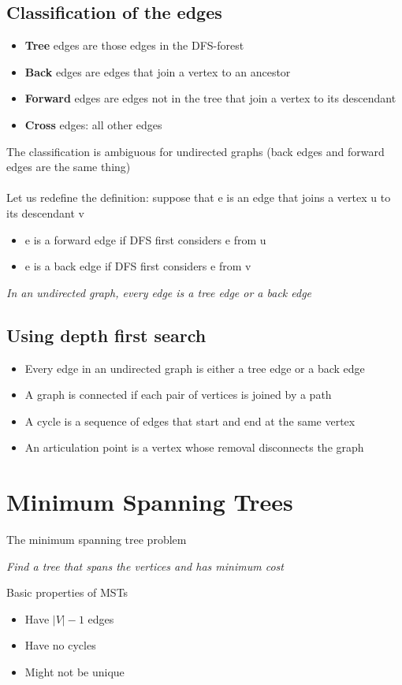 \documentclass{article}[18pt]
\begin{document}
\subsection{Classification of the edges}
\begin{itemize}
	\item \textbf{Tree} edges are those edges in the DFS-forest
	\item \textbf{Back} edges are edges that join a vertex to an ancestor
	\item \textbf{Forward} edges are edges not in the tree that join a vertex to its descendant
	\item \textbf{Cross} edges: all other edges
\end{itemize}
The classification is ambiguous for undirected graphs (back edges and forward edges are the same thing)\\
\\
Let us redefine the definition: suppose that e is an edge that joins a vertex u to its descendant v
\begin{itemize}
	\item e is a forward edge if DFS first considers e from u
	\item e is a back edge if DFS first considers e from v
\end{itemize}
\begin{center}
	\textit{In an undirected graph, every edge is a tree edge or a back edge}
\end{center}
\subsection{Using depth first search}
\begin{itemize}
	\item Every edge in an undirected graph is either a tree edge or a back edge
	\item A graph is connected if each pair of vertices is joined by a path
	\item A cycle is a sequence of edges that start and end at the same vertex
	\item An articulation point is a vertex whose removal disconnects the graph
\end{itemize}
\section{Minimum Spanning Trees}
The minimum spanning tree problem
\begin{center}
	\textit{Find a tree that spans the vertices and has minimum cost}
\end{center}
Basic properties of MSTs
\begin{itemize}
	\item Have $|V|-1$ edges
	\item Have no cycles
	\item Might not be unique
\end{itemize}
\end{document}
